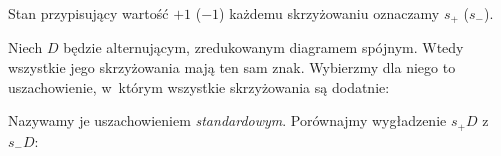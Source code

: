 \begin{definition}
    Stan przypisujący wartość $+1$ ($-1$) każdemu skrzyżowaniu oznaczamy $s_+$ ($s_-$).
\end{definition}

Niech $D$ będzie alternującym, zredukowanym diagramem spójnym.
Wtedy wszystkie jego skrzyżowania mają ten sam znak.
Wybierzmy dla niego to uszachowienie, w~którym wszystkie skrzyżowania są dodatnie:

Nazywamy je uszachowieniem \emph{standardowym}.
%
Porównajmy wygładzenie $s_+D$ z~$s_-D$:
